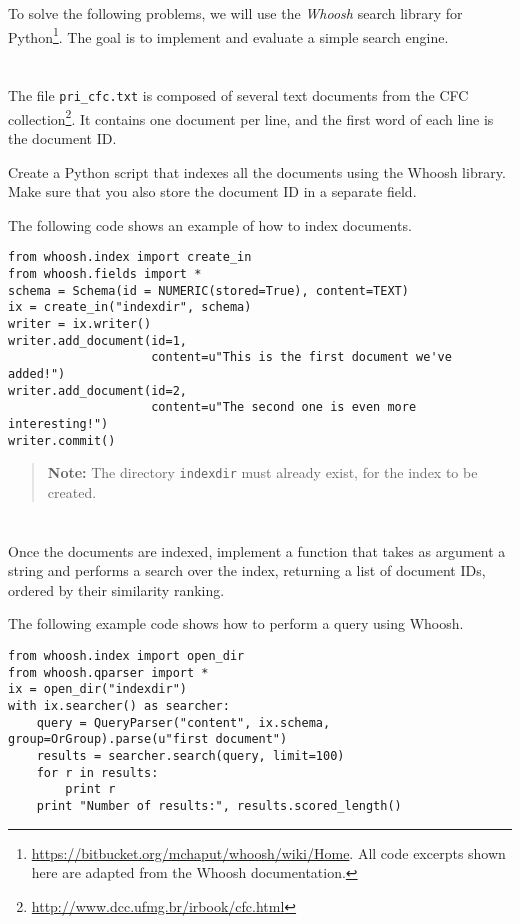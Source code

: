 \documentclass[12pt]{article}
\begin{document}

To solve the following problems, we will use the \emph{Whoosh} search library
for Python\footnote{\url{https://bitbucket.org/mchaput/whoosh/wiki/Home}. All
  code excerpts shown here are adapted from the Whoosh documentation.}. The
goal is to implement and evaluate a simple search engine.

\section{}

The file \texttt{pri\_cfc.txt} is composed of several text documents from
the CFC collection\footnote{\url{http://www.dcc.ufmg.br/irbook/cfc.html}}. It
contains one document per line, and the first word of each line is the
document ID.

Create a Python script that indexes all the documents using the Whoosh
library. Make sure that you also store the document ID in a separate field.

The following code shows an example of how to index documents.
\begin{verbatim}
from whoosh.index import create_in
from whoosh.fields import *
schema = Schema(id = NUMERIC(stored=True), content=TEXT)
ix = create_in("indexdir", schema)
writer = ix.writer()
writer.add_document(id=1,
                    content=u"This is the first document we've added!")
writer.add_document(id=2,
                    content=u"The second one is even more interesting!")
writer.commit()
\end{verbatim}

\begin{quote}
    \textbf{Note:} The directory \texttt{indexdir} must already exist, for the
    index to be created.
\end{quote}

\section{}

Once the documents are indexed, implement a function that takes as argument a
string and performs a search over the index, returning a list of document IDs,
ordered by their similarity ranking.

The following example code shows how to perform a query using Whoosh.
\begin{verbatim}
from whoosh.index import open_dir
from whoosh.qparser import *
ix = open_dir("indexdir")
with ix.searcher() as searcher:
    query = QueryParser("content", ix.schema, group=OrGroup).parse(u"first document")
    results = searcher.search(query, limit=100)
    for r in results:
        print r
    print "Number of results:", results.scored_length()
\end{verbatim}
\end{document}
